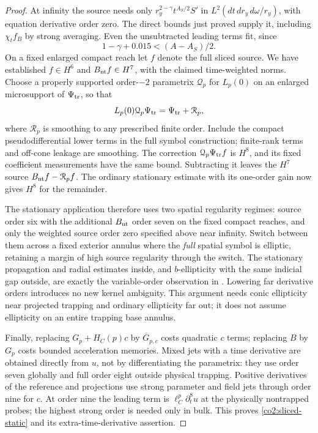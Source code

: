 \begin{proof}
At infinity the source needs only
$r_y^{2-\gamma}t^{A_S/2}S'$ in $L^2(dt\,dr_y\,d\omega/r_y)$, with
equation derivative order zero.  The direct bounds just proved supply it,
including $\chi_t f_B$ by strong averaging.  Even the unsubtracted leading
terms fit, since
\[
 1-\gamma+0.015<(A-A_S)/2.
\]
On a fixed enlarged compact reach let $f$ denote the full sliced source.
We have established $f\in H^6$ and $B_{\rm nt}f\in H^7$, with the
claimed time-weighted norms.  Choose a properly supported order-$-2$
parametrix $\mathcal Q_p$ for $L_p(0)$ on an enlarged microsupport of
$\Psi_{\rm tr}$, so that
\[
 L_p(0)\mathcal Q_p\Psi_{\rm tr}
       =\Psi_{\rm tr}+\mathcal R_p,
\]
where $\mathcal R_p$ is smoothing to any prescribed finite order.  Include
the compact pseudodifferential lower terms in the full symbol construction;
finite-rank terms and off-cone leakage are smoothing.  The correction
$\mathcal Q_p\Psi_{\rm tr}f$ is $H^8$, and its fixed coefficient
measurements have the same bound.  Subtracting it leaves the $H^7$ source
$B_{\rm nt}f-\mathcal R_pf$.  The ordinary stationary estimate with its
one-order gain now gives $H^8$ for the remainder.

The stationary application therefore uses two spatial regularity regimes:
source order six with the additional $B_{\rm nt}$ order seven on the fixed
compact reaches, and only the weighted source order zero specified above
near infinity.  Switch between them across a fixed exterior annulus where
the \emph{full} spatial symbol is elliptic, retaining a margin of high source
regularity through the switch.  The stationary propagation and radial
estimates inside, and $b$-ellipticity with the same indicial gap outside, are exactly the
variable-order observation in .  Lowering far
derivative orders introduces no new kernel ambiguity.  This argument needs
conic ellipticity near projected trapping and ordinary ellipticity far out;
it does not assume ellipticity on an entire trapping base annulus.

Finally, replacing $G_p+H_C(p)c$ by $\overline G_{p,c}$ costs quadratic
$c$ terms; replacing $B$ by $G_p$ costs bounded acceleration memories.
Mixed jets with a time derivative are obtained directly from $u$, not by
differentiating the parametrix: they use order seven globally and full order
eight outside physical trapping.  Positive derivatives of the reference and
projections use strong parameter and field jets through order nine for $c$.
At order nine the leading term is $\ell_C^p\partial_t^8u$ at the physically
nontrapped probes; the highest strong order is needed only in bulk.  This
proves \eqref{co2:sliced-static} and its extra-time-derivative assertion.
\end{proof}

